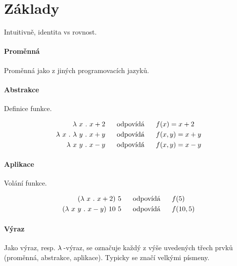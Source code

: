 
\section{Základy}

\begin{compactitem}
    \item Intuitivně, identita vs rovnost.
\end{compactitem}

\paragraph*{Proměnná} Proměnná jako z jiných programovacích jazyků.

\paragraph*{Abstrakce} Definice funkce.

\begin{equation}
    \begin{split}
        \operatorname{\lambda\,} x \operatorname{\,.\,} x+2 &~~~~~ \text{odpovídá} ~~~~~ f(x) = x+2 \\
        \operatorname{\lambda\,} x \operatorname{\,.\,} \operatorname{\lambda\,} y \operatorname{\,.\,} x+y &~~~~~ \text{odpovídá} ~~~~~ f(x, y) = x+y \\
        \operatorname{\lambda\,} x ~ y \operatorname{\,.\,} x-y &~~~~~ \text{odpovídá} ~~~~~ f(x, y) = x-y
    \end{split}
\end{equation}

\paragraph*{Aplikace} Volání funkce.

\begin{equation}
    \begin{split}
        ( \operatorname{\lambda\,} x \operatorname{\,.\,} x+2) ~ 5 &~~~~~ \text{odpovídá} ~~~~~ f(5) \\
        ( \operatorname{\lambda\,} x ~ y \operatorname{\,.\,} x-y) ~ 10 ~ 5 &~~~~~ \text{odpovídá} ~~~~~ f(10, 5)
    \end{split}
\end{equation}

\paragraph*{Výraz} Jako výraz, resp. $\operatorname{\lambda\,}$-výraz, se označuje každý z výše uvedených třech prvků (proměnná, abstrakce, aplikace). Typicky se značí velkými písmeny.

